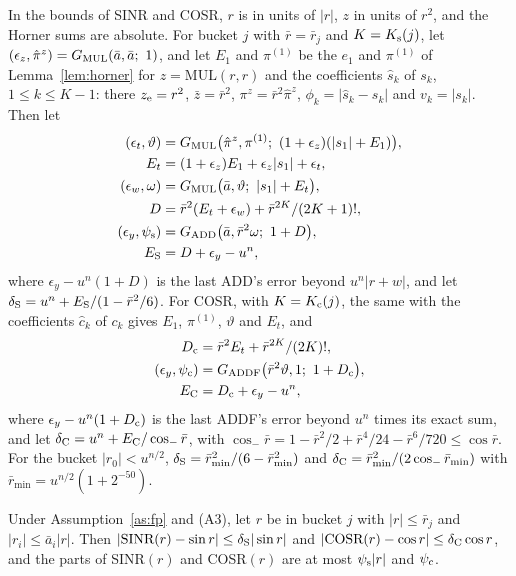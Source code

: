 In the bounds of SINR and COSR, $r$ is in units of $|r|$, $z$ in units of $r^2$, and the Horner sums are absolute. For
bucket $j$ with $\bar r = \bar r_j$ and $K = K_{\rm s}(j)$, let $(\epsilon_z, \hat\pi^z) = G_{\rm MUL}(\bar a, \bar a;\ 1)$,
and let $E_1$ and $\pi^{(1)}$ be the $e_1$ and $\pi^{(1)}$ of Lemma~\ref{lem:horner} for $z = \mathrm{MUL}(r, r)$ and
the coefficients $\hat s_k$ of $s_k$, $1 \le k \le K-1$: there $z_{\rm e} = r^2$, $\bar z = \bar r^2$, $\pi^z = \bar
r^2\hat\pi^z$, $\phi_k = |\hat s_k - s_k|$ and $v_k = |s_k|$. Then let
\begin{align*}
(\epsilon_t, \vartheta) &= G_{\rm MUL}\bigl(\hat\pi^z, \pi^{(1)};\ (1+\epsilon_z)(|s_1| + E_1)\bigr), \\
E_t &= (1+\epsilon_z)E_1 + \epsilon_z|s_1| + \epsilon_t, \\
(\epsilon_w, \omega) &= G_{\rm MUL}\bigl(\bar a, \vartheta;\ |s_1| + E_t\bigr), \\
D &= \bar r^2(E_t + \epsilon_w) + \bar r^{2K}/(2K+1)!, \\
(\epsilon_y, \psi_{\rm s}) &= G_{\rm ADD}\bigl(\bar a, \bar r^2\omega;\ 1 + D\bigr), \\
E_{\rm S} &= D + \epsilon_y - u^n,
\end{align*}
where $\epsilon_y - u^n(1 + D)$ is the last ADD's error beyond $u^n|r + w|$, and let $\delta_{\rm S} = u^n + E_{\rm
S}/(1 - \bar r^2/6)$. For COSR, with $K = K_{\rm c}(j)$, the same with the
coefficients $\hat c_k$ of $c_k$ gives $E_1$, $\pi^{(1)}$, $\vartheta$ and $E_t$, and
\begin{align*}
D_{\rm c} &= \bar r^2E_t + \bar r^{2K}/(2K)!, \\
(\epsilon_y, \psi_{\rm c}) &= G_{\rm ADDF}\bigl(\bar r^2\vartheta, 1;\ 1 + D_{\rm c}\bigr), \\
E_{\rm C} &= D_{\rm c} + \epsilon_y - u^n,
\end{align*}
where $\epsilon_y - u^n(1 + D_{\rm c})$ is the last ADDF's error beyond $u^n$ times its exact sum, and let
$\delta_{\rm C} = u^n + E_{\rm C}/\cos_- \bar r$, with $\cos_- \bar r = 1 - \bar r^2/2 + \bar r^4/24 - \bar r^6/720 \le \cos \bar r$. For the
bucket $|r_0| < u^{n/2}$, $\delta_{\rm S} = \bar r_{\min}^2/(6 - \bar r_{\min}^2)$ and $\delta_{\rm C} = \bar
r_{\min}^2/(2\cos_- \bar r_{\min})$ with $\bar r_{\min} = u^{n/2}(1 + 2^{-50})$.

\begin{lemma}\label{lem:sincosr}
Under Assumption~\ref{as:fp} and (A3), let $r$ be in bucket $j$ with $|r| \le \bar r_j$ and $|r_i| \le
\bar a_i|r|$. Then $|\textrm{SINR}(r) - \sin r| \le \delta_{\rm S}|\sin r|$ and $|\textrm{COSR}(r) - \cos r| \le
\delta_{\rm C}\cos r$, and the parts of SINR$(r)$ and COSR$(r)$ are at most $\psi_{\rm s}|r|$ and $\psi_{\rm c}$.
\end{lemma}

